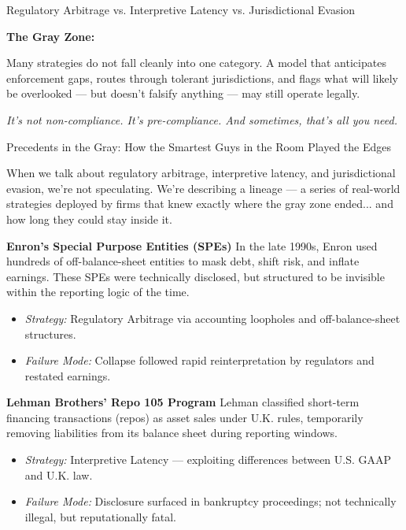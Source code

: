 \begin{TechnicalSidebar}{Regulatory Arbitrage vs. Interpretive Latency vs. Jurisdictional Evasion}
  \medskip
  
  \textbf{The Gray Zone:}
  
  Many strategies do not fall cleanly into one category.  
  A model that anticipates enforcement gaps, routes through tolerant jurisdictions,  
  and flags what will likely be overlooked — but doesn’t falsify anything —  
  may still operate legally.
  
  \medskip
  
  \textit{It’s not non-compliance. It’s pre-compliance. And sometimes, that’s all you need.}
  
\end{TechnicalSidebar}

\medskip

\begin{HistoricalSidebar}{Precedents in the Gray: How the Smartest Guys in the Room Played the Edges}

  When we talk about regulatory arbitrage, interpretive latency, and jurisdictional evasion,  
  we’re not speculating.  
  We’re describing a lineage — a series of real-world strategies deployed by firms that knew exactly 
  where the gray zone ended... and how long they could stay inside it.
  
  \medskip
  
  \textbf{Enron’s Special Purpose Entities (SPEs)}  
  In the late 1990s, Enron used hundreds of off-balance-sheet entities to mask debt, shift risk, 
  and inflate earnings.  
  These SPEs were technically disclosed, but structured to be invisible within the reporting logic of the time.
  
  \begin{itemize}
    \item \textit{Strategy:} Regulatory Arbitrage via accounting loopholes and off-balance-sheet structures.
    \item \textit{Failure Mode:} Collapse followed rapid reinterpretation by regulators and restated earnings.
  \end{itemize}
  
  \medskip
  
  \textbf{Lehman Brothers’ Repo 105 Program}  
  Lehman classified short-term financing transactions (repos) as asset sales under U.K. rules,  
  temporarily removing liabilities from its balance sheet during reporting windows.
  
  \begin{itemize}
    \item \textit{Strategy:} Interpretive Latency — exploiting differences between U.S. GAAP and U.K. law.
    \item \textit{Failure Mode:} Disclosure surfaced in bankruptcy proceedings; not technically illegal, 
    but reputationally fatal.
  \end{itemize}
  

\end{HistoricalSidebar}
